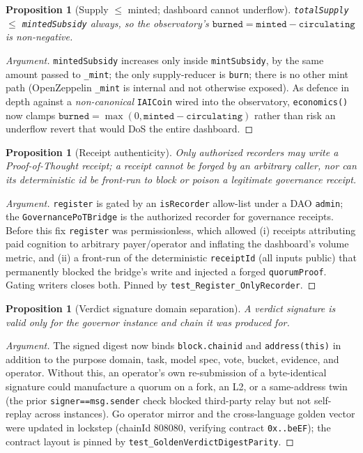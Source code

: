 \documentclass[11pt]{article}
\newtheorem{proposition}[theorem]{Proposition}
\begin{document}
\begin{proposition}[Supply $\le$ minted; dashboard cannot underflow]
\texttt{totalSupply} $\le$ \texttt{mintedSubsidy} always, so the observatory's
$\texttt{burned}=\texttt{minted}-\texttt{circulating}$ is non-negative.
\end{proposition}
\begin{proof}[Argument]
\texttt{mintedSubsidy} increases only inside \texttt{mintSubsidy}, by the same
amount passed to \texttt{\_mint}; the only supply-reducer is \texttt{burn}; there
is no other mint path (OpenZeppelin \texttt{\_mint} is internal and not
otherwise exposed). As defence in depth against a \emph{non-canonical}
\texttt{IAICoin} wired into the observatory, \texttt{economics()} now clamps
$\texttt{burned}=\max(0,\texttt{minted}-\texttt{circulating})$ rather than risk an
underflow revert that would DoS the entire dashboard.
\end{proof}

\begin{proposition}[Receipt authenticity]
Only authorized recorders may write a Proof-of-Thought receipt; a receipt cannot
be forged by an arbitrary caller, nor can its deterministic id be front-run to
block or poison a legitimate governance receipt.
\end{proposition}
\begin{proof}[Argument]
\texttt{register} is gated by an \texttt{isRecorder} allow-list under a DAO
\texttt{admin}; the \texttt{GovernancePoTBridge} is the authorized recorder for
governance receipts. Before this fix \texttt{register} was permissionless, which
allowed (i) receipts attributing paid cognition to arbitrary payer/operator and
inflating the dashboard's volume metric, and (ii) a front-run of the
deterministic \texttt{receiptId} (all inputs public) that permanently blocked the
bridge's write and injected a forged \texttt{quorumProof}. Gating writers closes
both. Pinned by \texttt{test\_Register\_OnlyRecorder}.
\end{proof}

\begin{proposition}[Verdict signature domain separation]
A verdict signature is valid only for the governor instance and chain it was
produced for.
\end{proposition}
\begin{proof}[Argument]
The signed digest now binds \texttt{block.chainid} and \texttt{address(this)} in
addition to the purpose domain, task, model spec, vote, bucket, evidence, and
operator. Without this, an operator's own re-submission of a byte-identical
signature could manufacture a quorum on a fork, an L2, or a same-address twin
(the prior \texttt{signer==msg.sender} check blocked third-party relay but not
self-replay across instances). Go operator mirror and the cross-language golden
vector were updated in lockstep (chainId $808080$, verifying contract
\texttt{0x..beEF}); the contract layout is pinned by
\texttt{test\_GoldenVerdictDigestParity}.
\end{proof}
\end{document}
